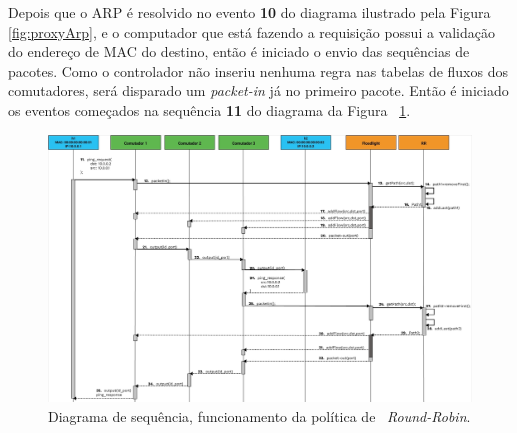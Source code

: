Depois que o ARP é resolvido no evento \textbf{10} do diagrama ilustrado pela Figura \ref{fig:proxyArp}, e o computador que está fazendo a requisição possui a validação do endereço de MAC do destino, então é iniciado o envio das sequências de pacotes. Como o controlador não inseriu nenhuma regra nas tabelas de fluxos dos comutadores, será disparado um \textit{packet-in} já no primeiro pacote. Então é iniciado os eventos começados na sequência \textbf{11} do diagrama da Figura ~\ref{fig:rr}.

\begin{figure}[htb!]
	\caption{\label{fig:rr} Diagrama de sequência, funcionamento da política de ~\emph{Round-Robin}.} 
	\begin{center}
	    \includegraphics[scale=0.43]{imagens/rr.1.jpg}
	\end{center}
\end{figure}

